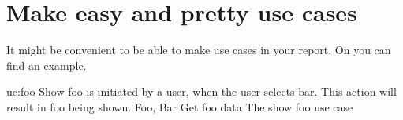 \section{Make easy and pretty use cases}
It might be convenient to be able to make use cases in your report. On  you can find an example.

        {uc:foo}
        {Show foo is initiated by a user, when the user selects bar. This action will result in foo being shown.}
        {Foo, Bar}
        {Get foo data}
        {The show foo use case}